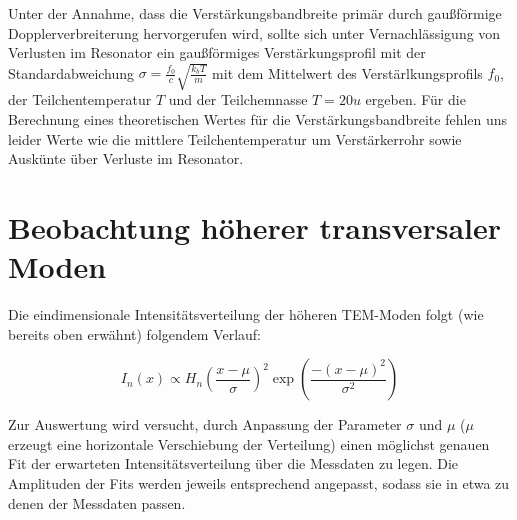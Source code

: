 \documentclass[bigchapter,colorback,accentcolor=tud4b,linedtoc,11pt]{tudreport}
\numberwithin{equation}{subsection}
\begin{document}
Unter der Annahme, dass die Verstärkungsbandbreite primär durch gaußförmige Dopplerverbreiterung hervorgerufen wird, sollte sich unter Vernachlässigung von Verlusten im Resonator ein gaußförmiges Verstärkungsprofil mit der Standardabweichung $\sigma = \frac{f_0}{c}\sqrt{\frac{k_b T}{m}}$ mit dem Mittelwert des Verstärlkungsprofils $f_0$, der Teilchentemperatur $T$ und der Teilchemnasse $T=20u$ ergeben. Für die Berechnung eines theoretischen Wertes für die Verstärkungsbandbreite fehlen uns leider Werte wie die mittlere Teilchentemperatur um Verstärkerrohr sowie Auskünte über Verluste im Resonator.

\section{Beobachtung höherer transversaler Moden}

Die eindimensionale Intensitätsverteilung der höheren TEM-Moden folgt (wie bereits oben erwähnt) folgendem Verlauf:

$$I_{n}(x) \propto H_n \left( \frac{x-\mu}{\sigma} \right)^2 \exp \left( \frac{-(x-\mu)^2}{\sigma^2} \right)  $$

Zur Auswertung wird versucht, durch Anpassung der Parameter \(\sigma\) und \(\mu\) (\(\mu\) erzeugt eine horizontale Verschiebung der Verteilung) einen möglichst genauen Fit der erwarteten Intensitätsverteilung über die Messdaten zu legen. Die Amplituden der Fits werden jeweils entsprechend angepasst, sodass sie in etwa zu denen der Messdaten passen.
\end{document}

